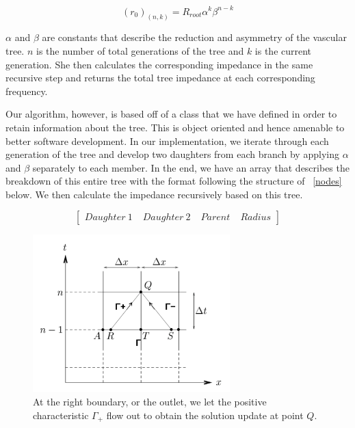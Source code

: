 \documentclass[12pt]{article}
\begin{document}
\begin{equation}
	\label{radius}
	(r_0)_(n,k) = R_{root} \alpha^k\beta^{n-k}
\end{equation}

$\alpha$ and $\beta$ are constants that describe the reduction and asymmetry of the vascular tree. $n$ is the number of total generations of the tree and $k$ is the current generation. She then calculates the corresponding impedance in the same recursive step and returns the total tree impedance at each corresponding frequency. 

Our algorithm, however, is based off of a class that we have defined in order to retain information about the tree. This is object oriented and hence amenable to better software development. In our implementation, we iterate through each generation of the tree and develop two daughters from each branch by applying $\alpha$ and $\beta$ separately to each member. In the end, we have an array that describes the breakdown of this entire tree with the format following the structure of ~\eqref{nodes} below. We then calculate the impedance recursively based on this tree.

\begin{equation}
	\label{nodes}
	\begin{bmatrix}
		Daughter \: 1 \; & Daughter \: 2 \; & Parent \; & Radius 
	\end{bmatrix}
\end{equation}

\begin{figure}
	\label{characteristicplot}
	\includegraphics[width=3in]{characterplot}
	\caption{At the right boundary, or the outlet, we let the positive characteristic $\Gamma_+$  flow out to obtain the solution update at point $Q$.~\cite{olufsenthesis}}
\end{figure}
\end{document}
